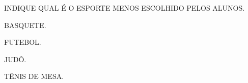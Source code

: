 INDIQUE QUAL É O ESPORTE MENOS ESCOLHIDO PELOS ALUNOS.

\begin{escolha}
\item BASQUETE.

\item FUTEBOL.

\item JUDÔ.

\item TÊNIS DE MESA.
\end{escolha}

\pagebreak